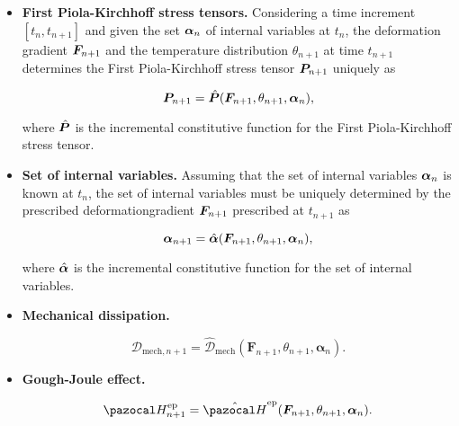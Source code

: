 \begin{itemize}
    \item \textbf{First Piola-Kirchhoff stress tensors.}   Considering a time increment $[t_n, t_{n+1}]$ and given the set $\bm{\alpha}_n$ of internal variables at $t_n$, the deformation gradient $\bm{F}_{n+1}$ and the temperature distribution \(\theta_{n+1}\) at time $t_{n+1}$ determines the First Piola-Kirchhoff stress tensor $\bm{P}_{n+1}$ uniquely as
        \begin{highlight}
    \begin{equation}
        \bm{P}_{n+1} = \hat{\bm{P}}(\bm{F}_{n+1}, \theta_{n+1}, \bm{\alpha}_n),
    \end{equation}
        \end{highlight}
    where $\hat{\bm{P}}$ is the incremental constitutive function for the First Piola-Kirchhoff stress tensor.
    \item \textbf{Set of internal variables.} Assuming that the set of internal variables $\bm{\alpha}_n$ is known at $t_n$, the set of internal variables must be uniquely determined by the prescribed deformationgradient $\bm{F}_{n+1}$ prescribed at $t_{n+1}$ as
    \begin{highlight}
        \begin{equation}
             \bm{\alpha}_{n+1} =\hat{\bm{\alpha}}(\bm{F}_{n+1}, \theta_{n+1}, \bm{\alpha}_n), \label{eq:incremental_flux}
        \end{equation}
    \end{highlight}
    where $\hat{\bm{\alpha}}$ is the incremental constitutive function for the set of internal variables.

    \item \textbf{Mechanical dissipation.}

    \begin{highlight}
    \begin{equation}
    \mathcal D_{\text{mech},n+1} = \hat{\mathcal D}_\text{mech}(\bm F_{n+1}, \theta_{n+1}, \bm \alpha_n).
    \end{equation}
    \end{highlight}

    \item \textbf{Gough-Joule effect.}

    \begin{highlight}
    \begin{equation}
    \pazocal H^\text{ep}_{n+1} = \hat{\pazocal H}^\text{ep}(\bm F_{n+1}, \theta_{n+1}, \bm \alpha_n).
    \end{equation}
    \end{highlight}
\end{itemize}



